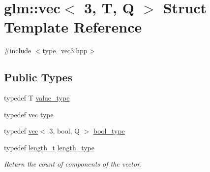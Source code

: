 \hypertarget{structglm_1_1vec_3_013_00_01_t_00_01_q_01_4}{}\section{glm\+:\+:vec$<$ 3, T, Q $>$ Struct Template Reference}
\label{structglm_1_1vec_3_013_00_01_t_00_01_q_01_4}


{\ttfamily \#include $<$type\+\_\+vec3.\+hpp$>$}

\subsection*{Public Types}
\begin{DoxyCompactItemize}
\item 
typedef T \mbox{\hyperlink{structglm_1_1vec_3_013_00_01_t_00_01_q_01_4_ac9d049f83235863ada16f91e67d28e3f}{value\+\_\+type}}
\item 
typedef \mbox{\hyperlink{structglm_1_1vec}{vec}} \mbox{\hyperlink{structglm_1_1vec_3_013_00_01_t_00_01_q_01_4_aab5e53af2d54d8353fecdd9071c14560}{type}}
\item 
typedef \mbox{\hyperlink{structglm_1_1vec}{vec}}$<$ 3, bool, Q $>$ \mbox{\hyperlink{structglm_1_1vec_3_013_00_01_t_00_01_q_01_4_a8574623d0fe3b330e18c10b8d5022ca6}{bool\+\_\+type}}
\item 
typedef \mbox{\hyperlink{namespaceglm_a090a0de2260835bee80e71a702492ed9}{length\+\_\+t}} \mbox{\hyperlink{structglm_1_1vec_3_013_00_01_t_00_01_q_01_4_ab586a87f82719bfdd180336a98843257}{length\+\_\+type}}
\begin{DoxyCompactList}\small\item\em Return the count of components of the vector. \end{DoxyCompactList}\end{DoxyCompactItemize}
